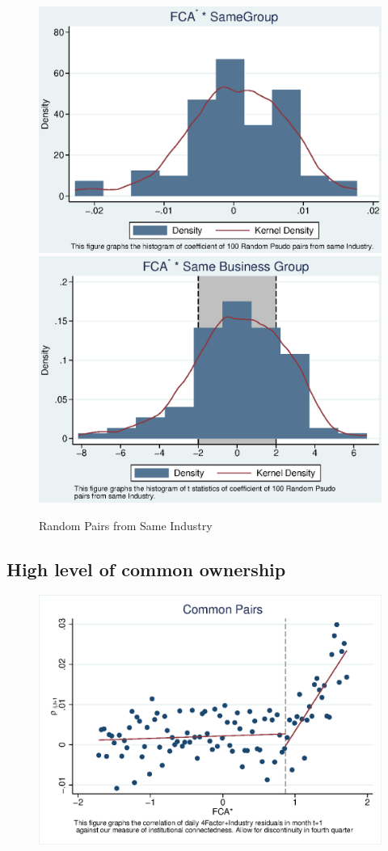 \documentclass[12pt, a4paper]{article}
\begin{document}
		


		\begin{figure}
			\centering
			\caption{Random Pairs from Same Industry}
			\includegraphics[width=0.45\linewidth]{IndustryPseudoSBFCA.eps}	
			\includegraphics[width=0.45\linewidth]{IndustryPseudoSBFCA_t.eps}
		\end{figure}




\FloatBarrier










\subsection{High level of common ownership}

 \begin{figure}[htbp]
 \centering  
\includegraphics[width=0.6\linewidth]{"Qmcorr5lrd.eps"}
\end{figure}
\end{document}
